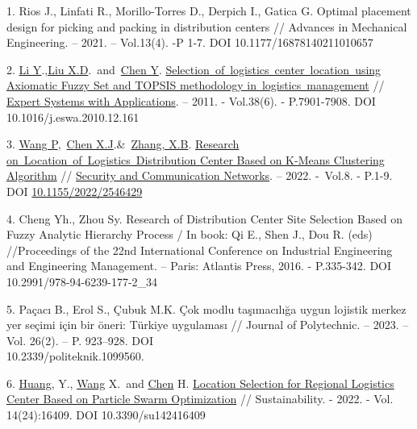 \begin{references}
1. Rios J., Linfati R., Morillo-Torres D., Derpich I., Gatica G. Optimal
placement design for picking and packing in distribution centers //
Advances in Mechanical Engineering. -- 2021. -- Vol.13(4). -P 1-7. DOI
10.1177/16878140211010657

2. \href{https://www.webofscience.com/wos/author/record/28556133}{Li
Y}.,\href{https://www.webofscience.com/wos/author/record/32561100}{Liu
X.D}.~and~\href{https://www.webofscience.com/wos/author/record/6098832}{Chen
Y}.
\href{https://www.webofscience.com/wos/woscc/full-record/WOS:000288343900166}{Selection~of~logistics~center~location~using
Axiomatic Fuzzy Set and TOPSIS methodology in~logistics~management} //
\href{https://www.sciencedirect.com/journal/expert-systems-with-applications}{Expert
Systems with Applications}. -- 2011. - Vol.38(6). - P.7901-7908. DOI
10.1016/j.eswa.2010.12.161

3. \href{https://www.webofscience.com/wos/author/record/14795379}{Wang
P},~\href{https://www.webofscience.com/wos/author/record/36107182}{Chen
X.J}.\&~\href{https://www.webofscience.com/wos/author/record/32493117}{Zhang,
X.B}.
\href{https://www.webofscience.com/wos/woscc/full-record/WOS:000830775300005}{Research
on~Location~of~Logistics~Distribution Center Based on K-Means
Clustering Algorithm} //
\href{https://www.researchgate.net/journal/Security-and-Communication-Networks-1939-0122}{Security
and Communication Networks}. -- 2022. -~Vol.8. - P.1-9. DOI
\href{http://dx.doi.org/10.1155/2022/2546429}{10.1155/2022/2546429}

4. Cheng Yh., Zhou Sy. Research of Distribution Center Site Selection
Based on Fuzzy Analytic Hierarchy Process / In book: Qi E., Shen J.,
Dou R. (eds) //Proceedings of the 22nd International Conference on
Industrial Engineering and Engineering Management. -- Paris: Atlantis
Press, 2016. - P.335-342. DOI 10.2991/978-94-6239-177-2\_34

5. Paçacı B., Erol S., Çubuk M.K. Çok modlu taşımacılığa uygun lojistik
merkez yer seçimi için bir öneri: Türkiye uygulaması // Journal of
Polytechnic. -- 2023. -- Vol. 26(2). -- P. 923--928. DOI\\
10.2339/politeknik.1099560.

6. \href{https://sciprofiles.com/profile/693277}{Huang}, Y.,
\href{https://sciprofiles.com/profile/2635021}{Wang} X.~and
\href{https://sciprofiles.com/profile/author/dFBVb3FoaXR6WVFmWlV5M0h1dGNXZz09}{Chen}
H. \href{https://www.mdpi.com/2071-1050/14/24/16409}{Location
Selection for Regional Logistics Center Based on Particle Swarm
Optimization} // Sustainability. - 2022. - Vol. 14(24):16409. DOI
10.3390/su142416409


\end{references}

